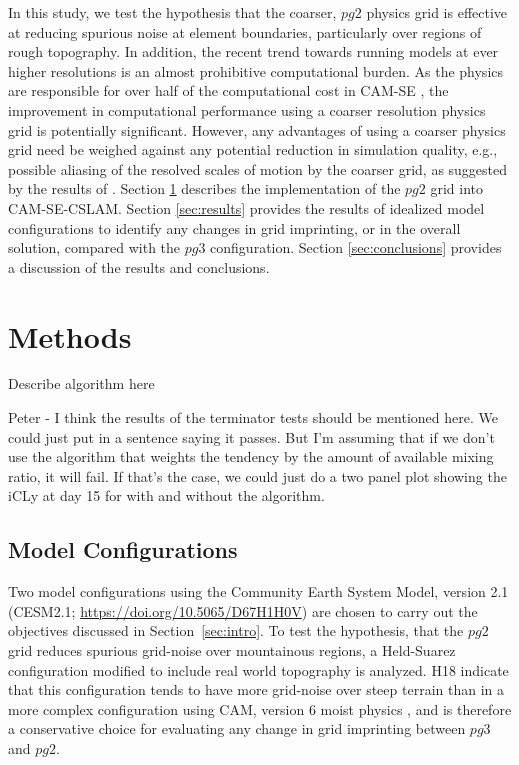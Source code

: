 \documentclass{agujournal}
\begin{document}
In this study, we test the hypothesis that the coarser, $pg2$ physics grid is effective at reducing spurious noise at element boundaries, particularly over regions of rough topography. In addition, the recent trend towards running models at ever higher resolutions is an almost prohibitive computational burden. As the physics are responsible for over half of the computational cost in CAM-SE \citep{LetAl2018JAMES}, the improvement in computational performance using a coarser resolution physics grid is potentially significant. However, any advantages of using a coarser physics grid need be weighed against any potential reduction in simulation quality, e.g., possible aliasing of the resolved scales of motion by the coarser grid, as suggested by the results of \cite{W1999T}. Section \ref{sec:methods} describes the implementation of the $pg2$ grid into CAM-SE-CSLAM. Section \ref{sec:results} provides the results of idealized model configurations to identify any changes in grid imprinting, or in the overall solution, compared with the $pg3$ configuration. Section \ref{sec:conclusions} provides a discussion of the results and conclusions.

\section{Methods}\label{sec:methods}


{\color{red}Describe algorithm here}

{\color{red}Peter -  I think the results of the terminator tests should be mentioned here. We could just put in a sentence saying it passes. But I'm assuming that if we don't use the algorithm that weights the tendency by the amount of available mixing ratio, it will fail. If that's the case, we could just do a two panel plot showing the iCLy at day 15 for with and without the algorithm.}

\subsection{Model Configurations}\label{sec:config}

Two model configurations using the Community Earth System Model, version 2.1 (CESM2.1; \url{https://doi.org/10.5065/D67H1H0V}) are chosen to carry out the objectives discussed in Section~\ref{sec:intro}. To test the hypothesis, that the $pg2$ grid reduces spurious grid-noise over mountainous regions, a Held-Suarez configuration \citep[$FHS94$ compset;][]{HS1994} modified to include real world topography is analyzed. H18 indicate that this configuration tends to have more grid-noise over steep terrain than in a more complex configuration using CAM, version 6 moist physics \citep[CAM6;][]{}, and is therefore a conservative choice for evaluating any change in grid imprinting between $pg3$ and $pg2$. 
\end{document}
